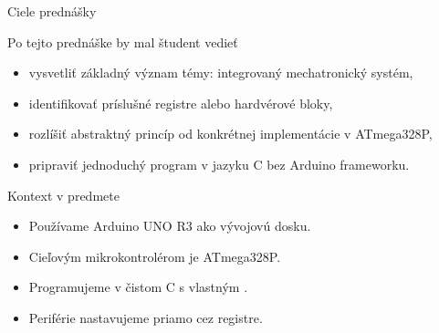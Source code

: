 
\begin{frame}{Ciele prednášky}
\begin{tukebox}{Po tejto prednáške by mal študent vedieť}
\begin{itemize}
    \item vysvetliť základný význam témy: integrovaný mechatronický systém,
    \item identifikovať príslušné registre alebo hardvérové bloky,
    \item rozlíšiť abstraktný princíp od konkrétnej implementácie v ATmega328P,
    \item pripraviť jednoduchý program v jazyku C bez Arduino frameworku.
\end{itemize}
\end{tukebox}
\end{frame}

\begin{frame}{Kontext v predmete}
\begin{itemize}
    \item Používame Arduino UNO R3 ako vývojovú dosku.
    \item Cieľovým mikrokontrolérom je ATmega328P.
    \item Programujeme v čistom C s vlastným .
    \item Periférie nastavujeme priamo cez registre.
\end{itemize}
\end{frame}
